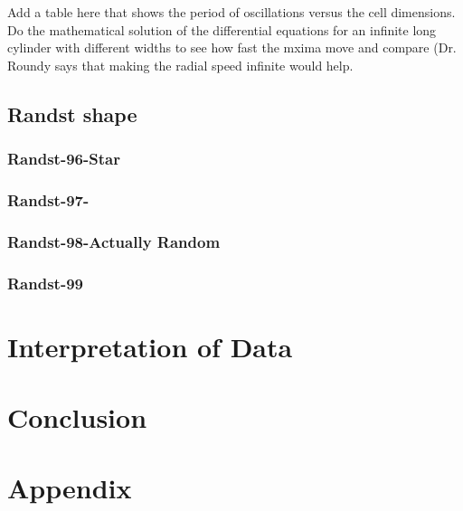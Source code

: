 \documentclass[letterpaper,twocolumn,amsmath,amssymb,pre]{revtex4-1}
\begin{document}
Add a table here that shows the period of oscillations versus the cell
dimensions.  Do the mathematical solution of the differential
equations for an infinite long cylinder with different widths to see
how fast the mxima move and compare (Dr. Roundy says that making the
radial speed infinite would help.


\subsection{Randst shape}
\subsubsection{Randst-96-Star}
\subsubsection{Randst-97-}
\subsubsection{Randst-98-Actually Random}
\subsubsection{Randst-99}
\section{Interpretation of Data}
\section{Conclusion}
\section*{Appendix}












\end{document}
